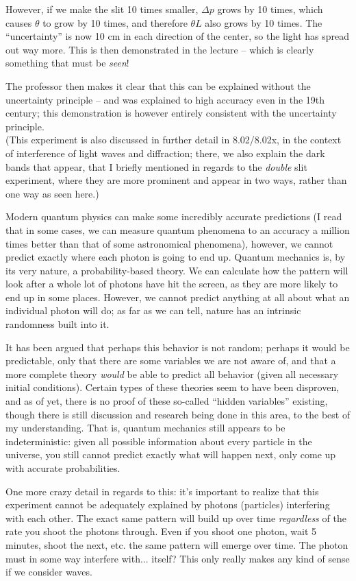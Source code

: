 \documentclass[8.01x]{subfiles}
\begin{document}
However, if we make the slit 10 times smaller, $\Delta p$ grows by 10 times, which causes $\theta$ to grow by 10 times, and therefore $\theta L$ also grows by 10 times. The ``uncertainty'' is now 10 cm in each direction of the center, so the light has spread out way more. This is then demonstrated in the lecture -- which is clearly something that must be \emph{seen}!

The professor then makes it clear that this can be explained without the uncertainty principle -- and was explained to high accuracy even in the 19th century; this demonstration is however entirely consistent with the uncertainty principle.\\
(This experiment is also discussed in further detail in 8.02/8.02x, in the context of interference of light waves and diffraction; there, we also explain the dark bands that appear, that I briefly mentioned in regards to the \emph{double} slit experiment, where they are more prominent and appear in two ways, rather than one way as seen here.)

Modern quantum physics can make some incredibly accurate predictions (I read that in some cases, we can measure quantum phenomena to an accuracy a million times better than that of some astronomical phenomena), however, we cannot predict exactly where each photon is going to end up. Quantum mechanics is, by its very nature, a probability-based theory. We can calculate how the pattern will look after a whole lot of photons have hit the screen, as they are more likely to end up in some places. However, we cannot predict anything at all about what an individual photon will do; as far as we can tell, nature has an intrinsic randomness built into it.

It has been argued that perhaps this behavior is not random; perhaps it would be predictable, only that there are some variables we are not aware of, and that a more complete theory \emph{would} be able to predict all behavior (given all necessary initial conditions). Certain types of these theories seem to have been disproven, and as of yet, there is no proof of these so-called ``hidden variables'' existing, though there is still discussion and research being done in this area, to the best of my understanding. That is, quantum mechanics still appears to be indeterministic: given all possible information about every particle in the universe, you still cannot predict exactly what will happen next, only come up with accurate probabilities.

One more crazy detail in regards to this: it's important to realize that this experiment cannot be adequately explained by photons (particles) interfering with each other. The exact same pattern will build up over time \emph{regardless} of the rate you shoot the photons through. Even if you shoot one photon, wait 5 minutes, shoot the next, etc. the same pattern will emerge over time. The photon must in some way interfere with... itself? This only really makes any kind of sense if we consider waves.
\end{document}
